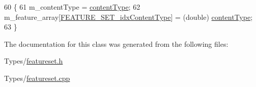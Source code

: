 \begin{DoxyCode}
60 \{
61     m\_contentType = \hyperlink{classFeatureSet_a9501ef16be4a0d58f1b9ac1834dbfad8}{contentType};
62     m\_feature\_array[\hyperlink{featureset_8h_ac4bad40688e41b3e2de5f3684858138fa53997946f52b2312511fa6f857187f4b}{FEATURE\_SET\_idxContentType}] = (double) 
      \hyperlink{classFeatureSet_a9501ef16be4a0d58f1b9ac1834dbfad8}{contentType};
63 \}
\end{DoxyCode}


The documentation for this class was generated from the following files\-:\begin{DoxyCompactItemize}
\item 
Types/\hyperlink{featureset_8h}{featureset.\-h}\item 
Types/\hyperlink{featureset_8cpp}{featureset.\-cpp}\end{DoxyCompactItemize}
